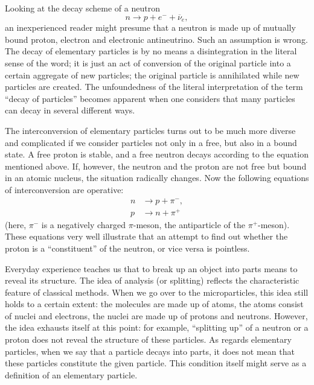 \documentclass[a4paper,sfsidenotes,colorlinks=true]{tufte-book}
\numberwithin{equation}{section}
\numberwithin{figure}{section}
\begin{document}
Looking at the decay scheme of a neutron 
\begin{equation*}
n \to  p + e^{-} + \overline{\nu}_{e}, 
\end{equation*}
an inexperienced reader might presume that a neutron is made up of
mutually bound proton, electron and electronic antineutrino. Such an
assumption is wrong. The decay of elementary particles is by no means
a disintegration in the literal sense of the word; it is just an act
of conversion of the original particle into a certain aggregate of new
particles; the original particle is annihilated while new particles
are created. The unfoundedness of the literal interpretation of the
term ``decay of particles'' becomes apparent when one considers that
many particles can decay in several different ways.  

The interconversion of elementary particles turns out to be much more
diverse and complicated if we consider particles not only in a free,
but also in a bound state. A free proton is stable, and a free neutron
decays according to the equation mentioned above. If, however, the
neutron and the proton are not free but bound in an atomic nucleus,
the situation radically changes. Now the following equations of
interconversion are operative: 
\begin{align*}
n &\to p + \pi^{-},\\
 p & \to n + \pi^{+} 
\end{align*}
(here, $\pi^{-}$ is a negatively charged $\pi$-meson, the antiparticle
of the $\pi^{+}$-meson). These equations very well illustrate that an
attempt to find out whether the proton is a ``constituent'' of the
neutron, or vice versa is pointless.  

Everyday experience teaches us that to break up an object into parts
means to reveal its structure. The idea of analysis (or splitting)
reflects the characteristic feature of classical methods. When we go
over to the microparticles, this idea still holds to a certain extent:
the molecules are made up of atoms, the atoms consist of nuclei and
electrons, the nuclei are made up of protons and neutrons. However,
the idea exhausts itself at this point: for example, ``splitting up'' of
a neutron or a proton does not reveal the structure of these
particles. As regards elementary particles, when we say that a
particle decays into parts, it does not mean that these particles
constitute the given particle. This condition itself might serve as a
definition of an elementary particle.  
\end{document}
